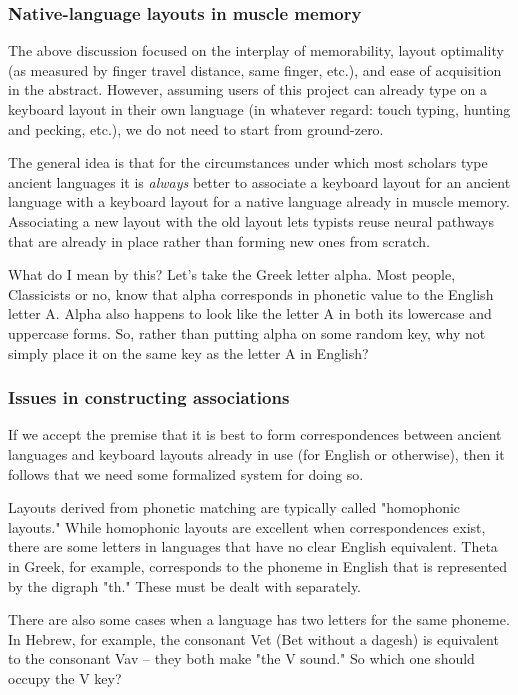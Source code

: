 \documentclass[11pt]{article}
\begin{document}
\subsubsection{Native-language layouts in muscle memory}
\label{sec:orgddc5a90}

The above discussion focused on the interplay of memorability, layout optimality (as measured by finger travel distance, same finger, etc.), and ease of acquisition in the abstract. However, assuming users of this project can already type on a keyboard layout in their own language (in whatever regard: touch typing, hunting and pecking, etc.), we do not need to start from ground-zero.

The general idea is that for the circumstances under which most scholars type ancient languages it is \emph{always} better to associate a keyboard layout for an ancient language with a keyboard layout for a native language already in muscle memory. Associating a new layout with the old layout lets typists reuse neural pathways that are already in place rather than forming new ones from scratch.

What do I mean by this? Let's take the Greek letter alpha. Most people, Classicists or no, know that alpha corresponds in phonetic value to the English letter A. Alpha also happens to look like the letter A in both its lowercase and uppercase forms. So, rather than putting alpha on some random key, why not simply place it on the same key as the letter A in English?

\subsubsection{Issues in constructing associations}
\label{sec:org3e9c253}

If we accept the premise that it is best to form correspondences between ancient languages and keyboard layouts already in use (for English or otherwise), then it follows that we need some formalized system for doing so.

Layouts derived from phonetic matching are typically called "homophonic layouts." While homophonic layouts are excellent when correspondences exist, there are some letters in languages that have no clear English equivalent. Theta in Greek, for example, corresponds to the phoneme in English that is represented by the digraph "th." These must be dealt with separately.

There are also some cases when a language has two letters for the same phoneme. In Hebrew, for example, the consonant Vet (Bet without a dagesh) is equivalent to the consonant Vav -- they both make "the V sound." So which one should occupy the V key?
\end{document}
